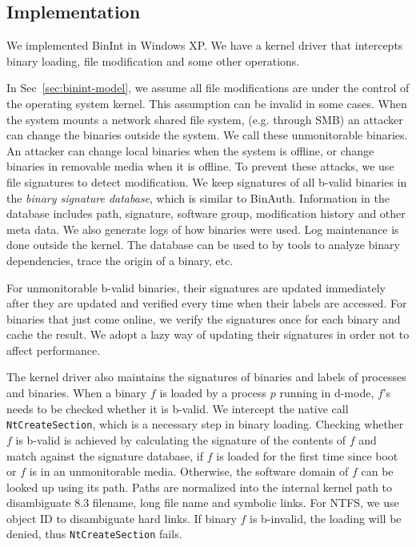 \subsection{Implementation}
\label{sec:binint-imp}

We implemented BinInt in Windows XP.
We have a kernel driver that intercepts binary loading,
file modification and some other operations.

In Sec~\ref{sec:binint-model}, we assume all file modifications are under
the control of the operating system kernel.
This assumption can be invalid in some cases.
When the system mounts a network shared file system, (e.g. through SMB)
an attacker can change the binaries outside the system.
We call these unmonitorable binaries.
An attacker can change local binaries when the system is offline,
or change binaries in removable media when it is offline.
To prevent these attacks, we use file signatures to detect modification.
We keep signatures of all b-valid binaries in the
{\em binary signature database},
which is similar to BinAuth.
Information in the database includes path, signature, software group,
modification history and other meta data.
We also generate logs of how binaries were used. Log maintenance is done
outside the kernel.
The database can be used to by tools to analyze binary dependencies,
trace the origin of a binary, etc.

For unmonitorable b-valid binaries, their signatures are updated
immediately after they are updated and verified every time when
their labels are accessed.
For binaries that just come online, we verify the signatures
once for each binary and cache the result.
We adopt a lazy way of updating their signatures in order
not to affect performance.

The kernel driver also maintains the signatures of binaries and
labels of processes and binaries.
When a binary $f$ is loaded by a process $p$ running in d-mode,
$f$'s needs to be checked whether it is b-valid.
We intercept the native call {\tt NtCreateSection},
which is a necessary step in binary loading.
Checking whether $f$ is b-valid is achieved by calculating 
the signature of the contents
of $f$ and match against the signature database, if $f$ is loaded for the first
time since boot or $f$ is in an unmonitorable media.
Otherwise, the software domain of $f$ can be looked up using its path.
Paths are normalized into
the internal kernel path to disambiguate 8.3 filename, long file name
and symbolic links.
For NTFS, we use object ID to disambiguate hard links.
If binary $f$ is b-invalid,
the loading will be denied, thus {\tt NtCreateSection} fails.

